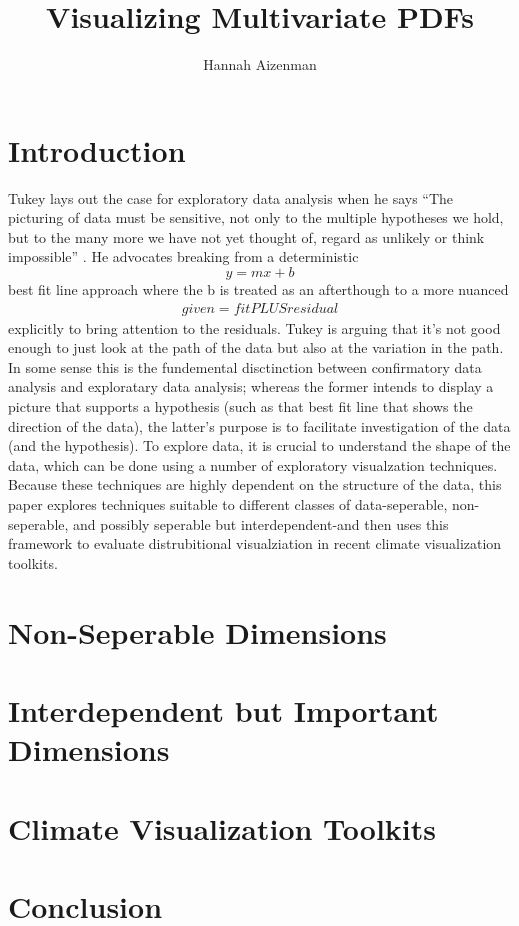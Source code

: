 \documentclass[letterpaper,onecolumn,titlepage]{Ythesis}
\title{Visualizing Multivariate PDFs}
\author{Hannah Aizenman}
\begin{document}
\makefrontmatter

\section{Introduction}
Tukey lays out the case for exploratory data analysis when
he says ``The picturing of data must be sensitive, not only to the multiple
hypotheses we hold, but to the many more we have not yet thought of, regard as unlikely or
think impossible'' \cite{tukey1975}. He advocates breaking from a deterministic $$y=mx+b$$
best fit line approach where the b is treated as an afterthough to a more
nuanced
\begin{align*}
  given = fit PLUS residual
\end{align*}
explicitly to bring attention to the residuals. Tukey is arguing that it's not
good enough to just look at the path of the data but also at the variation in
the path. In some sense this is the fundemental disctinction between
confirmatory data analysis and exploratary data analysis; whereas the former
intends to display a picture that supports a hypothesis (such as that best fit
line that shows the direction of the data), the latter's purpose is to
facilitate investigation of the data (and the hypothesis). To explore data, it
is crucial to understand the shape of the data, which can be done using a
number of exploratory visualzation techniques. Because these techniques are
highly dependent on the structure of the data, this paper explores techniques suitable to different classes of data-seperable, non-seperable, and
possibly seperable but interdependent-and then uses this framework to evaluate
distrubitional visualziation in recent climate visualization toolkits. 


\section{Non-Seperable Dimensions}
\section{Interdependent but Important Dimensions}
\section{Climate Visualization Toolkits}

\section{Conclusion}
\label{sec:conclusion}


\pagebreak
\printbibliography
\end{document}
